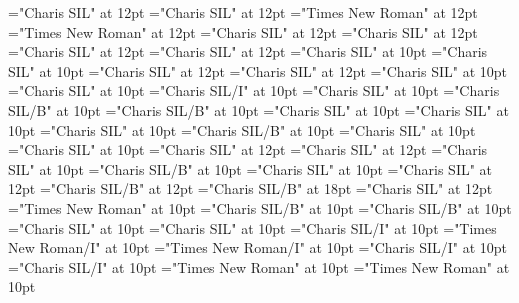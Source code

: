 \documentclass[a4paper,twoside]{article}
\begin{document}
\pagestyle{plain}
\sloppy
\setlength{\parfillskip}{0pt plus 1fil}
\font\diven="Charis SIL" at 12pt
\font\spanen="Charis SIL" at 12pt
\font\divpt="Times New Roman" at 12pt
\font\spanpt="Times New Roman" at 12pt
\font\divseh="Charis SIL" at 12pt
\font\spanseh="Charis SIL" at 12pt
\font\divsehfonipaxetic="Charis SIL" at 12pt
\font\spansehfonipaxetic="Charis SIL" at 12pt
\font\xitemen="Charis SIL" at 10pt
\font\xitemxitemcomplexformrefsbefore="Charis SIL" at 10pt
\font\xitemxitemdefinitionbefore="Charis SIL" at 12pt
\font\xitemxitemdefinitionLcbefore="Charis SIL" at 12pt
\font\xitemxitementryrefcomponentbefore="Charis SIL" at 10pt
\font\xitemxitementryreftypebefore="Charis SIL" at 10pt
\font\xitemxitemexamplebefore="Charis SIL/I" at 10pt
\font\xitemxitemexamplesbefore="Charis SIL" at 10pt
\font\xitemxitemheadwordbefore="Charis SIL/B" at 10pt
\font\xitemxitemLexEntrypublishStemComponentTargetHeadWordRefbefore="Charis SIL/B" at 10pt
\font\xitemxitemlexreftargetsbefore="Charis SIL" at 10pt
\font\xitemxitemprimaryrefsbefore="Charis SIL" at 10pt
\font\xitemxitemrelationsbefore="Charis SIL" at 10pt
\font\xitemxitemsensecrossrefbefore="Charis SIL/B" at 10pt
\font\sensesensesensesbefore="Charis SIL" at 10pt
\font\sensesensesubsensesbefore="Charis SIL" at 10pt
\font\xitemxitemtranslationbefore="Charis SIL" at 12pt
\font\xitemxitemtranslationLcbefore="Charis SIL" at 12pt
\font\xitemxitemvariantrefentrytypebefore="Charis SIL" at 10pt
\font\xitemxitemvariantrefformbefore="Charis SIL/B" at 10pt
\font\xitemxitemvariantrefsbefore="Charis SIL" at 10pt
\font\xitemtpi="Charis SIL" at 12pt
\font{}="Charis SIL/B" at 12pt
\font{}="Charis SIL/B" at 18pt
\font{}="Charis SIL" at 12pt
\font\entryletDatadicBody="Times New Roman" at 10pt
\font\headwordsehentryletDatadicBody="Charis SIL/B" at 10pt
\font\spanenheadwordsehentryletDatadicBody="Charis SIL/B" at 10pt
\font\sensesentryletDatadicBody="Charis SIL" at 10pt
\font\sensesensesentryletDatadicBody="Charis SIL" at 10pt
\font\grammaticalinfosensesensesentryletDatadicBody="Charis SIL/I" at 10pt
\font\partofspeechptgrammaticalinfosensesensesentryletDatadicBody="Times New Roman/I" at 10pt
\font\spanptpartofspeechptgrammaticalinfosensesensesentryletDatadicBody="Times New Roman/I" at 10pt
\font\spanenpartofspeechptgrammaticalinfosensesensesentryletDatadicBody="Charis SIL/I" at 10pt
\font\spanengrammaticalinfosensesensesentryletDatadicBody="Charis SIL/I" at 10pt
\font{}="Times New Roman" at 10pt
\font\xitemptdefinitionLcptsensesensesentryletDatadicBody="Times New Roman" at 10pt
\end{document}
